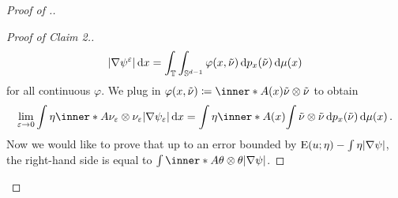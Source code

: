 \begin{proof}[Proof of .]
\begin{proof}[Proof of Claim 2.]
\begin{equation*}
			\abs{ \nabla \psi^{ \varepsilon } }
			\dd{ x }
			=
			\int_{ \operatorname{\mathbb{T}} }
			\int_{ \mathbb{ S }^{ d - 1 } }
			\varphi ( x, \tilde{ \nu } )
			\dd{ p_{ x } ( \tilde{ \nu } ) }
			\dd{ \mu ( x ) }
		\end{equation*} 
		for all continuous $ \varphi $.
		We plug in $ \varphi ( x , \tilde{ 
			\nu } ) \coloneqq \inner*{ A ( x ) }{ \tilde{ \nu } \otimes \tilde{ 
			\nu 
		} } $ 
		to obtain
		\begin{equation*}
			\lim_{ \varepsilon \to 0}
			\int
			\eta
			\inner*{ A }{ \nu_{ \varepsilon } \otimes \nu_{ \varepsilon 
			} }
			\abs{ \nabla \psi_{ \varepsilon } }
			\dd{ x }
			=
			\int
			\eta
			\inner*{ A ( x ) }
			{
				\int
				\tilde{ \nu } \otimes \tilde{ \nu }
				\dd{ p_{ x } ( \tilde{ \nu } ) }
			}
			\dd{ \mu ( x ) }.
		\end{equation*}
		Now we would like to prove that up to an error bounded by $ \operatorname{E} ( u 
		; \eta ) - \int \eta \abs{ \nabla \psi } $, the right-hand side is 
		equal to $ \int \inner*{ A }{ \theta \otimes \theta } \abs{ \nabla \psi 
		} $.
		

\end{proof}
\end{proof}
